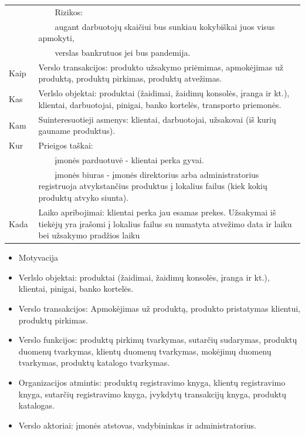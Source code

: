 \documentclass{VUMIFPSkursinis}
\newcommand{\tabitem}{~~\llap{\textbullet}~~}
\newcommand{\tabitemd}{~~\llap{\textopenbullet}~~}
\begin{document}
\begin{center}
\begin{table}[ht]
\begin{tabular}{| p{0.1\linewidth} | p{0.9\linewidth }|}
		&\hspace{4mm}\tabitem Rizikos: \\
		&\hspace{8mm}\tabitemd augant darbuotojų skaičiui bus sunkiau kokybiškai juos visus apmokyti, \\
		&\hspace{8mm}\tabitemd verslas bankrutuos jei bus pandemija. \\ \hline
	Kaip 	&  Verslo transakcijos: produkto užsakymo priėmimas, apmokėjimas už produktą, produktų pirkimas, produktų atvežimas. \\ \hline
	Kas 	& Verlslo objektai: produktai (žaidimai, žaidimų konsolės, įranga ir kt.), klientai, darbuotojai, pinigai, banko kortelės, transporto priemonės. \\ \hline
	Kam 	& Suinteresuotieji asmenys: klientai, darbuotojai, užsakovai (iš kurių gauname produktus). \\ \hline
	Kur 	& Prieigos taškai: \\
		&\hspace{4mm}\tabitem įmonės parduotuvė - klientai perka gyvai.\\ 
		&\hspace{4mm}\tabitem įmonės biuras - įmonės direktorius arba administratorius registruoja atvykstančius produktus į lokalius failus (kiek kokių produktų atvyko siunta). \\ \hline
	Kada 	& Laiko apribojimai: klientai perka jau esamas prekes. Užsakymai iš tiekėjų yra įrašomi į lokalius failus su numatyta atvežimo data ir laiku bei užsakymo pradžios laiku\\ \hline																				
	\end{tabular}
\end{table}	
\end{center}
\newpage
\begin{itemize}
	\item Motyvacija
	\item Verlslo objektai: produktai (žaidimai, žaidimų konsolės, įranga ir kt.), klientai, pinigai, banko kortelės.
	\item Verslo transakcijos: Apmokėjimas už produktą, produkto pristatymas klientui, produktų pirkimas.
	\item Verslo funkcijos: produktų pirkimų tvarkymas, sutarčių sudarymas, produktų duomenų tvarkymas, klientų duomenų tvarkymas, mokėjimų duomenų tvarkymas, produktų katalogo tvarkymas.
	\item Organizacijos atmintis: produktų registravimo knyga, klientų registravimo knyga, sutarčių registravimo knyga, įvykdytų transakcijų knyga, produktų katalogas.
	\item Verslo aktoriai: įmonės atstovas, vadybininkas ir administratorius.
\end{itemize}
\newpage
\end{document}
